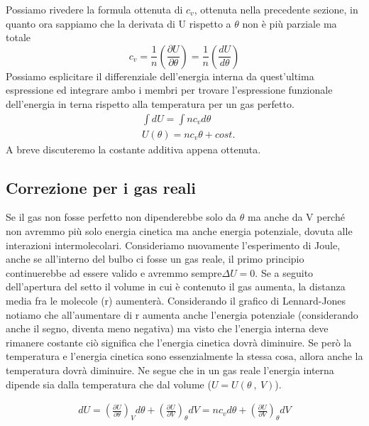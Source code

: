 \documentclass[10pt,a4paper]{article}
\begin{document}
Possiamo rivedere la formula ottenuta di \(c_v\), ottenuta nella precedente sezione, in quanto ora sappiamo che la derivata di U rispetto a $\theta$ non è più parziale ma totale
\[c_v =\frac{1}{n}\left(\frac{\partial U}{\partial\theta}\right)=\frac{1}{n}\left(\frac{dU}{d\theta}\right)\]
Possiamo esplicitare il differenziale dell'energia interna da quest'ultima espressione ed integrare ambo i membri per trovare l'espressione funzionale dell'energia in terna rispetto alla temperatura per un gas perfetto.
\begin{align}\label{eq:U_gas_perfetti}
	&\int dU = \int n c_v d\theta\nonumber\\
	&U(\theta) = n c_v \theta + cost.
\end{align} 
A breve discuteremo la costante additiva appena ottenuta.
\subsection{Correzione per i gas reali}
Se il gas non fosse perfetto non dipenderebbe solo da $\theta$ ma anche da V perché non avremmo più solo energia cinetica ma anche energia potenziale, dovuta alle interazioni intermolecolari. Consideriamo nuovamente l'esperimento di Joule, anche se all'interno del bulbo ci fosse un gas reale, il primo principio continuerebbe ad essere valido e avremmo sempre\(\Delta U = 0\). Se a seguito dell'apertura del setto il volume in cui è contenuto il gas aumenta, la distanza media fra le molecole (r) aumenterà. Considerando il grafico di Lennard-Jones notiamo che all'aumentare di r aumenta anche l'energia potenziale (considerando anche il segno, diventa meno negativa) ma visto che l'energia interna deve rimanere costante ciò significa che l'energia cinetica dovrà diminuire. Se però la temperatura e l'energia cinetica sono essenzialmente la stessa cosa, allora anche la temperatura dovrà diminuire. Ne segue che in un gas reale l'energia interna dipende sia dalla temperatura che dal volume (\(U = U(\theta\ ,\ V)\)). 

\begin{align*} 
	dU = \left(\frac{\partial U}{\partial \theta}\right)_V d\theta + \left(\frac{\partial U}{\partial V}\right)_{\theta} dV = n c_v d\theta +\left(\frac{\partial U}{\partial V}\right)_{\theta}dV
\end{align*} 
\end{document}
